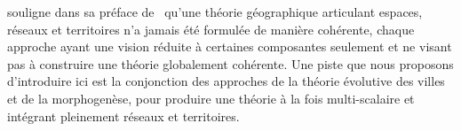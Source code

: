 % 
% 
%
%



 souligne dans sa préface de~\cite{offner1996reseaux} qu'une théorie géographique articulant espaces, réseaux et territoires n'a jamais été formulée de manière cohérente, chaque approche ayant une vision réduite à certaines composantes seulement et ne visant pas à construire une théorie globalement cohérente. Une piste que nous proposons d'introduire ici est la conjonction des approches de la théorie évolutive des villes et de la morphogenèse, pour produire une théorie à la fois multi-scalaire et intégrant pleinement réseaux et territoires.





